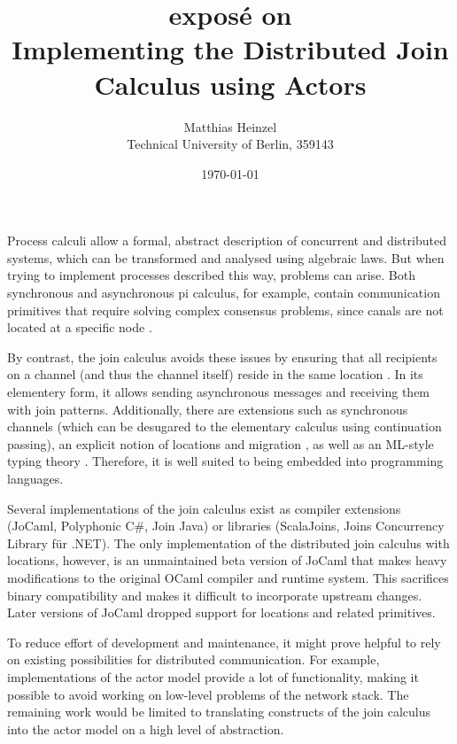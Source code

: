 \documentclass[12pt]{article}
\title{
  {\large expos\'e on} \\
  Implementing the Distributed Join Calculus using Actors
}
\author{Matthias Heinzel\\Technical University of Berlin, 359143}
\date{\today}
\begin{document}
\maketitle

Process calculi allow a formal, abstract description of concurrent and distributed systems, which can be transformed and analysed using algebraic laws.
But when trying to implement processes described this way, problems can arise.
Both synchronous and asynchronous pi calculus, for example, contain communication primitives that require solving complex consensus problems, since canals are not located at a specific node \cite{peters_distributability_2013}.

By contrast, the join calculus avoids these issues by ensuring that all recipients on a channel (and thus the channel itself) reside in the same location \cite{fournet_reflexive_1996}.
In its elementery form, it allows sending asynchronous messages and receiving them with join patterns.
Additionally, there are extensions such as synchronous channels (which can be desugared to the elementary calculus using continuation passing), an explicit notion of locations and migration \cite{fournet_calculus_1996}, as well as an ML-style typing theory \cite{fournet_implicit_1997}. Therefore, it is well suited to being embedded into programming languages.

Several implementations of the join calculus exist as compiler extensions (JoCaml\cite{mandel_programming_2007}, Polyphonic C\#\cite{benton_modern_2002}, Join Java\cite{itzstein_implementing_2003}) or libraries (ScalaJoins\cite{haller_implementing_2008}, Joins Concurrency Library für .NET\cite{russo_joins_2007}).
The only implementation of the distributed join calculus with locations, however, is an unmaintained beta version of JoCaml that makes heavy modifications to the original OCaml compiler and runtime system\cite{conchon_jocaml:_1999}.
This sacrifices binary compatibility and makes it difficult to incorporate upstream changes. Later versions of JoCaml dropped support for locations and related primitives.

To reduce effort of development and maintenance, it might prove helpful to rely on existing possibilities for distributed communication. For example, implementations of the actor model provide a lot of functionality, making it possible to avoid working on low-level problems of the network stack.
The remaining work would be limited to translating constructs of the join calculus into the actor model on a high level of abstraction.
\end{document}
